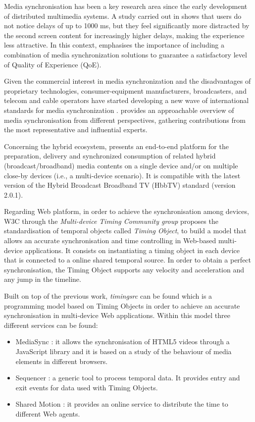 Media synchronisation has been a key research area since the early development of distributed multimedia systems. A study carried out in \cite{ziegler2017time} shows that users do not notice delays of up to 1000 ms, but they feel significantly more distracted by the second screen content for increasingly higher delays, making the experience less attractive. In this context, \cite{boronat2017hybrid} emphasises the importance of including a combination of media synchronization solutions to guarantee a satisfactory level of Quality of Experience (QoE).

Given the commercial interest in media synchronization and the disadvantages of proprietary technologies, consumer-equipment manufacturers, broadcasters, and telecom and cable operators have started developing a new wave of international standards for media synchronization \cite{van2016standards}. \cite{montagud2018mediasync} provides an approachable overview of media synchronisation from different perspectives, gathering contributions from the most representative and influential experts. 

Concerning the hybrid ecosystem, \cite{boronat2017hbbtv} presents an end-to-end platform for the preparation, delivery and synchronized consumption of related hybrid (broadcast/broadband) media contents on a single device and/or on multiple close-by devices (i.e., a multi-device scenario). It is compatible with the latest version of the Hybrid Broadcast Broadband TV (HbbTV) standard (version 2.0.1).

Regarding Web platform, in order to achieve the synchronisation among devices, W3C through the \textit{Multi-device Timing Community group} \cite{timingComGr} proposes the standardisation of temporal objects called \textit{Timing Object}, to build a model that allows an accurate synchronisation and time controlling in Web-based multi-device applications. It consists on instantiating a timing object in each device that is connected to a online shared temporal source. In order to obtain a perfect synchronisation, the Timing Object supports any velocity and acceleration and any jump in the timeline.

Built on top of the previous work, \textit{timingsrc} \cite{tsrc} can be found which is a programming model based on Timing Objects in order to achieve an accurate synchronisation in multi-device Web applications. Within this model three different services can be found:
\begin{itemize}
	\item MediaSync \cite{mediasync}: it allows the synchronisation of HTML5 videos through a JavaScript library and it is based on a study of the behaviour of media elements in different browsers.
	\item Sequencer \cite{sequencer}: a generic tool to process temporal data. It provides entry and exit events for data used with Timing Objects. 
	\item Shared Motion \cite{shmotion}: it provides an online service to distribute the time to different Web agents. 
\end{itemize}




